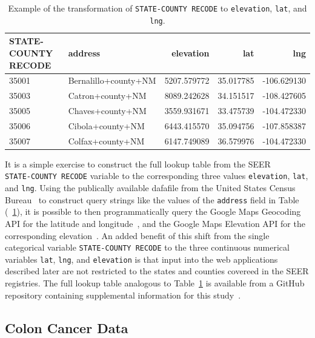 \documentclass[a4paper,11pt]{article}
\newcommand{\code}[1]{\colorbox{light-gray}{\texttt{#1}}}
\begin{document}
\begin{table}[tbp]
\begin{center}
\begin{tabular}{llrrr}
\toprule
 STATE-COUNTY RECODE &               address &    elevation &        lat &         lng \\
\midrule
35001 &  Bernalillo+county+NM &  5207.579772 &  35.017785 & -106.629130 \\
35003 &      Catron+county+NM &  8089.242628 &  34.151517 & -108.427605 \\
35005 &      Chaves+county+NM &  3559.931671 &  33.475739 & -104.472330 \\
35006 &      Cibola+county+NM &  6443.415570 &  35.094756 & -107.858387 \\
35007 &      Colfax+county+NM &  6147.749089 &  36.579976 & -104.472330 \\
\bottomrule
\end{tabular}
\caption{\label{tab:nmhead} Example of the transformation of \code{STATE-COUNTY RECODE} to \code{elevation}, \code{lat}, and \code{lng}.}
\end{center}
\end{table}

It is a simple exercise to construct the full lookup table from the SEER \\  \code{STATE-COUNTY RECODE} variable to the corresponding three values \code{elevation}, \code{lat}, and \code{lng}. Using the publically available dafafile from the United States Census Bureau~\cite{census} to construct query strings like the values of the \code{address} field in Table (~\ref{tab:nmhead}), it is possible to then programmatically query the Google Maps Geocoding API for the latitude and longitude~\cite{geocode}, and the Google Maps Elevation API for the corresponding elevation~\cite{elevation}.
An added benefit of this shift from the single categorical variable \code{STATE-COUNTY RECODE} to the three continuous numerical variables \code{lat}, \code{lng}, and \code{elevation} is that input into the web applications described later are not restricted to the states and counties covereed in the SEER registries. The full lookup table analogous to Table~\ref{tab:nmhead} is available from a GitHub repository containing supplemental information for this study~\cite{supp}.


\subsection{Colon Cancer Data}
\label{subsec:coloncancerdata}
\end{document}
